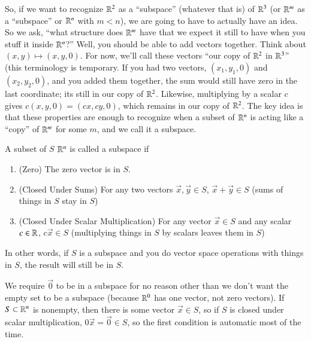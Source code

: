 So, if we want to recognize $\mathbb{R}^2$ as a ``subspace'' (whatever that is) of $\mathbb{R}^3$ (or $\mathbb{R}^m$ as a ``subspace'' or $\mathbb{R}^n$ with $m<n$), we are going to have to actually have an idea.
So we ask, ``what structure does $\mathbb{R}^m$ have that we expect it still to have when you stuff it inside $\mathbb{R}^n$?''
Well, you should be able to add vectors together.
Think about $(x,y)\mapsto (x,y,0)$.  For now, we'll call these vectors ``our copy of $\mathbb{R}^2$ in $\mathbb{R}^3$'' (this terminology is temporary.  
If you had two vectors, $(x_1,y_1,0)$ and $(x_2,y_2,0)$, and you added them together, the sum would still have zero in the last coordinate; its still in our copy of $\mathbb{R}^2$.  
Likewise, multiplying by a scalar $c$ gives $c(x,y,0) = (cx,cy,0)$, which remains in our copy of $\mathbb{R}^2$.  
The key idea is that these properties are enough to recognize when a subset of $\mathbb{R}^n$ is acting like a ``copy'' of $\mathbb{R}^m$ for some $m$, and we call it a subspace.
\begin{Def}[Subspace]
  \label{sec:defsubspace}
  A subset of $S$ $\mathbb{R}^n$ is called a subspace if
  \begin{enumerate}
  \item (Zero) The zero vector is in $S$.  
  \item (Closed Under Sums) For any two vectors $\vec{x},\vec{y}\in S$, $\vec{x}+\vec{y}\in S$ (sums of things in $S$ stay in $S$)
  \item (Closed Under Scalar Multiplication) For any vector $\vec{x}\in S$ and any scalar $c\in \mathbb{R}$, $c\vec{x}\in S$ (multiplying things in $S$ by scalars leaves them in $S$)
  \end{enumerate}
  In other words, if $S$ is a subspace and you do vector space operations with things in $S$, the result will still be in $S$.
\end{Def}
\begin{UnimportantRemark}
  We require $\vec{0}$ to be in a subspace for no reason other than we don't want the empty set to be a subspace (because $\mathbb{R}^0$ has one vector, not zero vectors).
  If $S\subset \mathbb{R}^n$ is nonempty, then there is some vector $\vec{x}\in S$, so if $S$ is closed under scalar multiplication, $0\vec{x}=\vec{0}\in S$, so the first condition is automatic most of the time.  
\end{UnimportantRemark}
